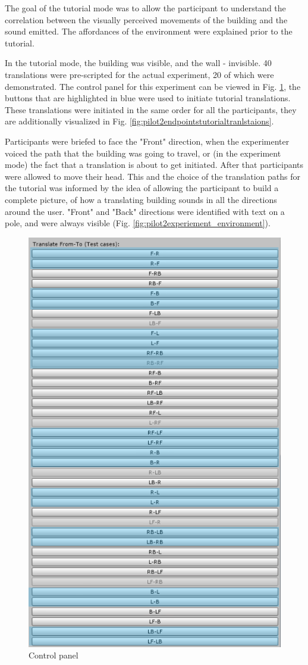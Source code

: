 The goal of the tutorial mode was to allow the participant to understand the correlation between the visually perceived movements of the building and the sound emitted. The affordances of the environment were explained prior to the tutorial.

In the tutorial mode, the building was visible, and the wall - invisible.
40 translations were pre-scripted for the actual experiment, 20 of which were demonstrated. The control panel for this experiment can be viewed in Fig. \ref{fig:pilot2tutorialcontrolpanelhighlighted}, the buttons that are highlighted in blue were used to initiate tutorial translations. These translations were initiated in the same order for all the participants, they are additionally visualized in Fig. \ref{fig:pilot2endpointstutorialtranlstaions}.

Participants were briefed to face the "Front" direction, when the experimenter voiced the path that the building was going to travel, or (in the experiment mode) the fact that a translation is about to get initiated. After that participants were allowed to move their head. This and the choice of the translation paths for the tutorial was informed by the idea of allowing the participant to build a complete picture, of how a translating building sounds in all the directions around the user. "Front" and "Back" directions were identified with text on a pole, and were always visible (Fig. \ref{fig:pilot2experiement_environment}).

\begin{figure}
	\centering
	\includegraphics[width=0.7\linewidth]{figures/pilot2_tutorial_control_panel_highlighted}
	\caption{Control panel}
	\label{fig:pilot2tutorialcontrolpanelhighlighted}
\end{figure}

